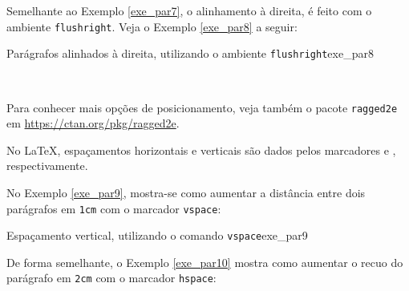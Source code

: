 Semelhante ao Exemplo \ref{exe_par7}, o alinhamento à direita, é feito com o ambiente {\tt flushright}. Veja o Exemplo \ref{exe_par8} a seguir:

\begin{texexptitled}[breakable,enhanced,middle=2mm]{Parágrafos alinhados à direita, utilizando o ambiente  {\tt flushright}}{exe_par8}
\begin{flushright}
\lipsumsentence[9-10] \\ 
\lipsumsentence[11-12]
\end{flushright}
\end{texexptitled}

%

\begin{marker}
Para conhecer mais opções de posicionamento, veja também o pacote {\tt ragged2e} em \url{https://ctan.org/pkg/ragged2e}.
\end{marker}

No \LaTeX{}, espaçamentos horizontais e verticais são dados pelos marcadores \texttt{\vspace{}} e \texttt{\hspace{}}, respectivamente.


No Exemplo \ref{exe_par9}, mostra-se como aumentar a distância entre dois parágrafos em {\tt 1cm} com o marcador {\tt vspace}:

\begin{texexptitled}[breakable,enhanced,middle=2mm]{Espaçamento vertical, utilizando o comando {\tt vspace}}{exe_par9}
\lipsumsentence[9-10] 
\vspace{1cm}
\lipsumsentence[11-12]
\end{texexptitled}

De forma semelhante, o Exemplo \ref{exe_par10} mostra como aumentar o recuo do parágrafo em {\tt 2cm} com o marcador {\tt hspace}:

